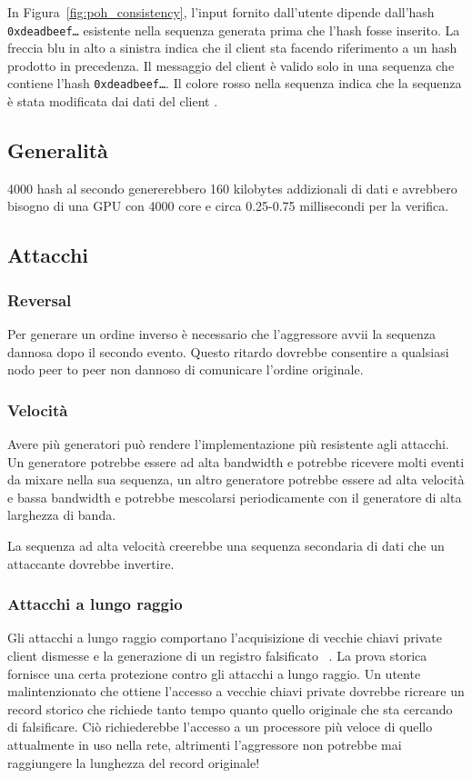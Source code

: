 \documentclass[12pt]{article}
\begin{document}
In Figura~\ref{fig:poh_consistency}, l'input fornito dall'utente dipende dall'hash \texttt{0xdeadbeef\ldots} esistente nella sequenza generata prima che l'hash fosse inserito. La freccia blu in alto a sinistra indica che il client sta facendo riferimento a un hash prodotto in precedenza. Il messaggio del client è valido solo in una sequenza che contiene l'hash \texttt{0xdeadbeef\ldots}. Il colore rosso nella sequenza indica che la sequenza è stata modificata dai dati del client	.

\subsection{Generalità}
4000 hash al secondo genererebbero 160 kilobytes addizionali di dati e avrebbero bisogno di una GPU con 4000 core e circa 0.25-0.75 millisecondi per la verifica.

\subsection{Attacchi}
\subsubsection{Reversal}
 Per generare un ordine inverso è necessario che l'aggressore avvii la sequenza dannosa dopo il secondo evento. Questo ritardo dovrebbe consentire a qualsiasi nodo peer to peer non dannoso di comunicare l'ordine originale.
 
\subsubsection{Velocità}
Avere più generatori può rendere l'implementazione più resistente agli attacchi. Un generatore potrebbe essere ad alta bandwidth 
e potrebbe ricevere molti eventi da mixare nella sua sequenza, un altro generatore potrebbe essere ad alta velocità e bassa bandwidth e potrebbe mescolarsi periodicamente con il generatore di alta larghezza di banda.

La sequenza ad alta velocità creerebbe una sequenza secondaria di dati che un attaccante dovrebbe invertire.

\subsubsection{Attacchi a lungo raggio}

Gli attacchi a lungo raggio comportano l'acquisizione di vecchie chiavi private client dismesse e la generazione di un registro falsificato ~\cite{casper}. La prova storica fornisce una certa protezione contro gli attacchi a lungo raggio. Un utente malintenzionato che ottiene l'accesso a vecchie chiavi private dovrebbe ricreare un record storico che richiede tanto tempo quanto quello originale che sta cercando di falsificare. Ciò richiederebbe l'accesso a un processore più veloce di quello attualmente in uso nella rete, altrimenti l'aggressore non potrebbe mai  raggiungere la lunghezza del record originale! 
\end{document}
